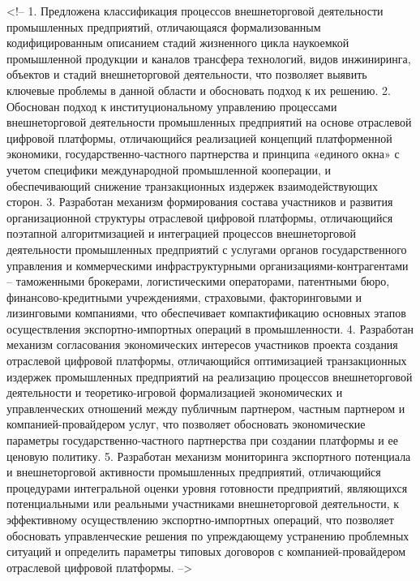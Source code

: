 <!-- 1. Предложена классификация процессов внешнеторговой деятельности промышленных предприятий, отличающаяся формализованным кодифицированным описанием стадий жизненного цикла наукоемкой промышленной продукции и каналов трансфера технологий, видов инжиниринга, объектов и стадий внешнеторговой деятельности, что позволяет выявить ключевые проблемы в данной области и обосновать подход к их решению.
2. Обоснован подход к институциональному управлению процессами внешнеторговой деятельности промышленных предприятий на основе отраслевой цифровой платформы, отличающийся реализацией концепций платформенной экономики, государственно-частного партнерства и принципа «единого окна» с учетом специфики международной промышленной кооперации, и обеспечивающий снижение транзакционных издержек взаимодействующих сторон.
3. Разработан механизм формирования состава участников и развития организационной структуры отраслевой цифровой платформы, отличающийся поэтапной алгоритмизацией и интеграцией процессов внешнеторговой деятельности промышленных предприятий с услугами органов государственного управления и коммерческими инфраструктурными организациями-контрагентами – таможенными брокерами, логистическими операторами, патентными бюро, финансово-кредитными учреждениями, страховыми, факторинговыми и лизинговыми компаниями, что обеспечивает компактификацию основных этапов осуществления экспортно-импортных операций в промышленности.
4. Разработан механизм согласования экономических интересов участников проекта создания отраслевой цифровой платформы, отличающийся оптимизацией транзакционных издержек промышленных предприятий на реализацию процессов внешнеторговой деятельности и теоретико-игровой формализацией экономических и управленческих отношений между публичным партнером, частным партнером и компанией-провайдером услуг, что позволяет обосновать экономические параметры государственно-частного партнерства при создании платформы и ее ценовую политику.
5. Разработан механизм мониторинга экспортного потенциала и внешнеторговой активности промышленных предприятий, отличающийся процедурами интегральной оценки уровня готовности предприятий, являющихся потенциальными или реальными участниками внешнеторговой деятельности, к эффективному осуществлению экспортно-импортных операций, что позволяет обосновать управленческие решения по упреждающему устранению проблемных ситуаций и определить параметры типовых договоров с компанией-провайдером отраслевой цифровой платформы.
 -->
